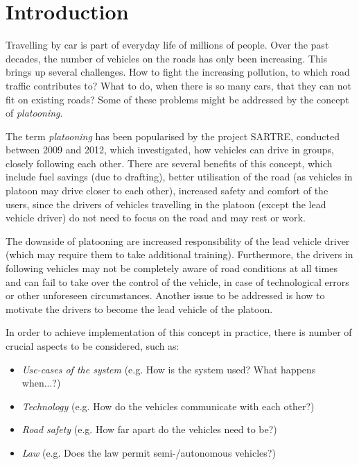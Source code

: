 


\section{Introduction}


Travelling by car is part of everyday life of millions of people. Over the past decades, the number of vehicles on the roads has only been increasing. This brings up several challenges. How to fight the increasing pollution, to which road traffic contributes to? What to do, when there is so many cars, that they can not fit on existing roads? Some of these problems might be addressed by the concept of \emph{platooning}.\par

The term \emph{platooning} has been popularised by the project SARTRE, conducted between 2009 and 2012, which investigated, how vehicles can drive in groups, closely following each other. There are several benefits of this concept, which include fuel savings (due to drafting\footnotemark[1]), better utilisation of the road (as vehicles in platoon may drive closer to each other), increased safety and comfort of the users, since the drivers of vehicles travelling in the platoon (except the lead vehicle driver) do not need to focus on the road and may rest or work.\par
The downside of platooning are increased responsibility of the lead vehicle driver (which may require them to take additional training). Furthermore, the drivers in following vehicles may not be completely aware of road conditions at all times and can fail to take over the control of the vehicle, in case of technological errors or other unforeseen circumstances. Another issue to be addressed is how to motivate the drivers to become the lead vehicle of the platoon.

In order to achieve implementation of this concept in practice, there is number of crucial aspects to be considered, such as:
\begin{itemize}[noitemsep]
    \item \emph{Use-cases of the system} (e.g. How is the system used? What happens when...?)
    \item \emph{Technology} (e.g. How do the vehicles communicate with each other?)
    \item \emph{Road safety} (e.g. How far apart do the vehicles need to be?)
    \item \emph{Law} (e.g. Does the law permit semi-/autonomous vehicles?)
\end{itemize} \par

